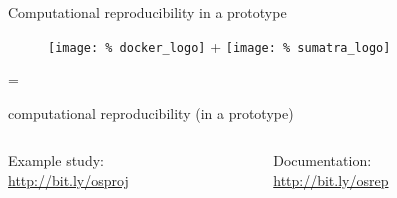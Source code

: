\begin{frame}{Computational reproducibility in a prototype}

  \begin{figure}
    \centering
    \texttt{[image: \%
      docker\_logo]} %
    \hspace{1cm}  {\Huge +} \hspace{1cm}
    \texttt{[image: \%
      sumatra\_logo]} %
  \end{figure}

  \vspace{-0.2cm}
  \begin{center}
    {\Huge = }
  \end{center}
  \vspace{-0.35cm}

  \begin{center}
    {\Large computational reproducibility (in a prototype)}
  \end{center}

  \vspace{0.4cm}
  
    \begin{columns}
      \begin{column}{.5\textwidth}
        \large
        \begin{center}
          Example study:\\
          \href{http://bit.ly/osproj}{http://bit.ly/osproj}
        \end{center}

      \end{column}
      \begin{column}{.5\textwidth}
        \begin{center}
          \large Documentation:\\
          \href{http://bit.ly/osrep}{http://bit.ly/osrep}
        \end{center}
        
      \end{column}
    \end{columns}
   

\end{frame}



